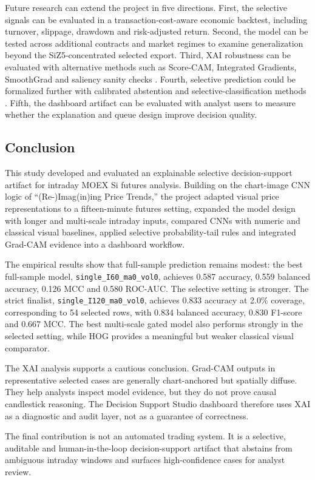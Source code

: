 Future research can extend the project in five directions. First, the selective signals can be evaluated in a transaction-cost-aware economic backtest, including turnover, slippage, drawdown and risk-adjusted return. Second, the model can be tested across additional contracts and market regimes to examine generalization beyond the SiZ5-concentrated selected export. Third, XAI robustness can be evaluated with alternative methods such as Score-CAM, Integrated Gradients, SmoothGrad and saliency sanity checks \cite{wang_scorecam,sundararajan_integrated_gradients,smilkov_smoothgrad,adebayo_sanity_checks}. Fourth, selective prediction could be formalized further with calibrated abstention and selective-classification methods \cite{chow_reject,elyaniv_selective,geifman_selective}. Fifth, the dashboard artifact can be evaluated with analyst users to measure whether the explanation and queue design improve decision quality.

\subsection{Conclusion}
\label{subsec:conclusion}

This study developed and evaluated an explainable selective decision-support artifact for intraday MOEX Si futures analysis. Building on the chart-image CNN logic of ``(Re-)Imag(in)ing Price Trends,'' the project adapted visual price representations to a fifteen-minute futures setting, expanded the model design with longer and multi-scale intraday inputs, compared CNNs with numeric and classical visual baselines, applied selective probability-tail rules and integrated Grad-CAM evidence into a dashboard workflow.

The empirical results show that full-sample prediction remains modest: the best full-sample model, \texttt{single\_I60\_ma0\_vol0}, achieves 0.587 accuracy, 0.559 balanced accuracy, 0.126 MCC and 0.580 ROC-AUC. The selective setting is stronger. The strict finalist, \texttt{single\_I120\_ma0\_vol0}, achieves 0.833 accuracy at 2.0\% coverage, corresponding to 54 selected rows, with 0.834 balanced accuracy, 0.830 F1-score and 0.667 MCC. The best multi-scale gated model also performs strongly in the selected setting, while HOG provides a meaningful but weaker classical visual comparator.

The XAI analysis supports a cautious conclusion. Grad-CAM outputs in representative selected cases are generally chart-anchored but spatially diffuse. They help analysts inspect model evidence, but they do not prove causal candlestick reasoning. The Decision Support Studio dashboard therefore uses XAI as a diagnostic and audit layer, not as a guarantee of correctness.

The final contribution is not an automated trading system. It is a selective, auditable and human-in-the-loop decision-support artifact that abstains from ambiguous intraday windows and surfaces high-confidence cases for analyst review.
